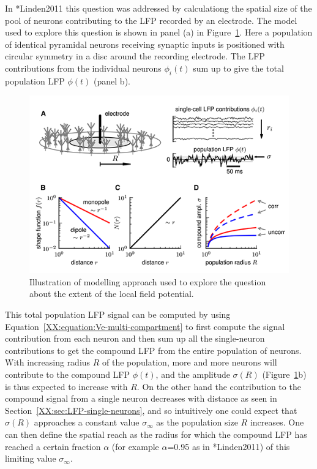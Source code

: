 In \citeasnoun**{Linden2011} this question was addressed by calculationg the spatial size of the pool of neurons 
contributing to the LFP recorded by an electrode. The model used to explore this question
is shown in panel (a) in Figure~\ref{LFP:fig:how-local}.
Here a population of identical pyramidal neurons receiving synaptic inputs is positioned
with circular symmetry in a disc around the recording electrode. The LFP contributions from the individual neurons 
$\phi_i(t)$ sum up to give the total population LFP  $\phi(t)$ (panel b).

\begin{figure}
\begin{center}
\includegraphics{Figures/LFP/LFP-how-local-is-the-LFP-w90-r150}
\end{center}
\caption[]{Illustration of modelling approach used to explore the question
about the extent of the local field potential.
}
\label{LFP:fig:how-local}
\end{figure}
  
This total population LFP signal can be computed by using 
Equation~\ref{XX:equation:Ve-multi-compartment} to first compute the signal contribution from each neuron and 
then sum up all the single-neuron contributions to get the compound LFP from the entire population of neurons.
With increasing radius $R$ of the population, more and more neurons will contribute to the compound LFP $\phi(t)$,
and the amplitude $\sigma(R)$ (Figure~\ref{LFP:fig:how-local}b) is thus expected to increase with
$R$. On the other hand the contribution to the compound signal from a single neuron decreases with distance 
as seen in Section~\ref{XX:sec:LFP-single-neurons}, and so intuitively one could expect that $\sigma(R)$ approaches
a constant value $\sigma_\infty$ as the population size $R$ increases. One can then define the spatial reach as the radius for which
the compound LFP has reached a certain fraction $\alpha$ (for example $\alpha$=0.95 as in \citeasnoun**{Linden2011}) of this limiting value $\sigma_\infty$. 


